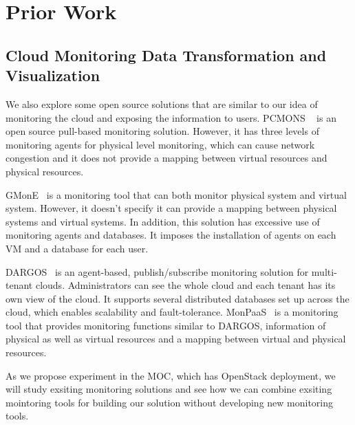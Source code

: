 

\section{Prior Work}
\label{sec:PriorWork}



\subsection{Cloud Monitoring Data Transformation and Visualization}

  We also explore some open source solutions that are similar to our idea of monitoring the cloud and exposing the information to users. PCMONS ~\cite{chaves2011toward} is an open source pull-based monitoring solution. However, it has three levels of monitoring agents for physical level monitoring, which can cause network congestion and it does not provide a mapping between virtual resources and physical resources. 

  GMonE~\cite{montes2013gmone} is a monitoring tool that can both monitor physical system and virtual system. However, it doesn't specify it can provide a mapping between physical systems and virtual systems. In addition, this solution has excessive use of monitoring agents and databases. It imposes the installation of agents on each VM and a database for each user. 

  DARGOS~\cite{povedano2013dargos}  is an agent-based, publish/subscribe monitoring solution for multi-tenant clouds. Administrators can see the whole cloud and each tenant has its own view of the cloud. It supports several distributed databases set up across the cloud, which enables scalability and fault-tolerance. MonPaaS~\cite{alcaraz2015monpaas} is a monitoring tool that provides monitoring functions similar to DARGOS, information of physical as well as virtual resources and a mapping between virtual and physical resources. 

  As we propose experiment in the MOC, which has OpenStack deployment, we will study exsiting monitoring solutions and see how we can combine exsiting mointoring tools for building our solution without developing new monitoring tools. 